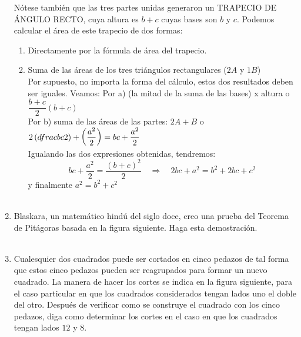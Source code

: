 \documentclass[10pt]{article}
\begin{document}
\begin{enumerate}
    Nótese también que las tres partes unidas generaron un TRAPECIO DE ÁNGULO RECTO, cuya altura es $b + c$ cuyas bases son $b$ y $c$. Podemos calcular el área de este trapecio de dos formas:
    \begin{enumerate}[\bfseries a)]
	\item Directamente por la fórmula de área del trapecio.
	\item Suma de las áreas de los tres triángulos rectangulares ($2A$ y $1B$)\\
    Por supuesto, no importa la forma del cálculo, estos dos resultados deben ser iguales. Veamos:
	    Por a) (la mitad de la suma de las bases) x altura o $\dfrac{b+c}{2}(b+c)$\\
	    Por b) suma de las áreas de las partes: $2A+B$ o $2\left(\\dfrac{bc}{2}\right)+\left(\dfrac{a^2}{2}\right)=bc+\dfrac{a^2}{2}$\\
	    Igualando las dos expresiones obtenidas, tendremos:
	    $$bc+\dfrac{a^2}{2}=\dfrac{(b+c)^2}{2} \quad \Longrightarrow \quad 2bc+a^2=b^2+2bc+c^2$$
	    y finalmente $a^2=b^2+ c^2$\\\\
    \end{enumerate}

\item Blaskara, un matemático hindú del siglo doce, creo una prueba del Teorema de Pitágoras basada en la figura siguiente. Haga esta demostración.\\\\

\item  Cualesquier dos cuadrados puede ser cortados en cinco pedazos de tal forma que estos cinco pedazos pueden ser reagrupados para formar un nuevo cuadrado. La manera de hacer los cortes se indica en la figura siguiente, para el caso particular en que los cuadrados considerados tengan lados uno el doble del otro. Después de verificar como se construye el cuadrado con los cinco pedazos, diga como determinar los cortes en el caso en que los cuadrados tengan lados $12$ y $8$.\\\\

\end{enumerate}
\end{document}
